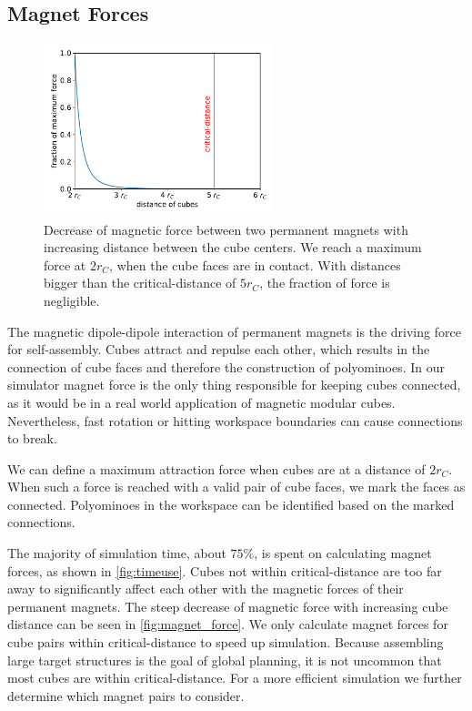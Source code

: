 \subsection{Magnet Forces}
\label{sec:force_magnet}

\begin{figure}
	\centering
	\includegraphics[width=0.6\textwidth]{figures/plots/magnet_force.pdf}
	\caption[Decrease of magnetic force with increasing cube distance]{Decrease of magnetic force between two permanent magnets with increasing distance between the cube centers. We reach a maximum force at $2 r_C$, when the cube faces are in contact. With distances bigger than the critical-distance of $5 r_C$, the fraction of force is negligible.}
	\label{fig:magnet_force}
\end{figure}

The magnetic dipole-dipole interaction of permanent magnets is the driving force for self-assembly.
Cubes attract and repulse each other, which results in the connection of cube faces and therefore the construction of polyominoes.
In our simulator magnet force is the only thing responsible for keeping cubes connected, as it would be in a real world application of magnetic modular cubes.
Nevertheless, fast rotation or hitting workspace boundaries can cause connections to break.

We can define a maximum attraction force when cubes are at a distance of $2 r_C$.
When such a force is reached with a valid pair of cube faces, we mark the faces as connected.
Polyominoes in the workspace can be identified based on the marked connections.

The majority of simulation time, about $75\%$, is spent on calculating magnet forces, as shown in \autoref{fig:timeuse}.
Cubes not within critical-distance are too far away to significantly affect each other with the magnetic forces of their permanent magnets.
The steep decrease of magnetic force with increasing cube distance can be seen in \autoref{fig:magnet_force}.
We only calculate magnet forces for cube pairs within critical-distance to speed up simulation.
Because assembling large target structures is the goal of global planning, it is not uncommon that most cubes are within critical-distance.
For a more efficient simulation we further determine which magnet pairs to consider.

